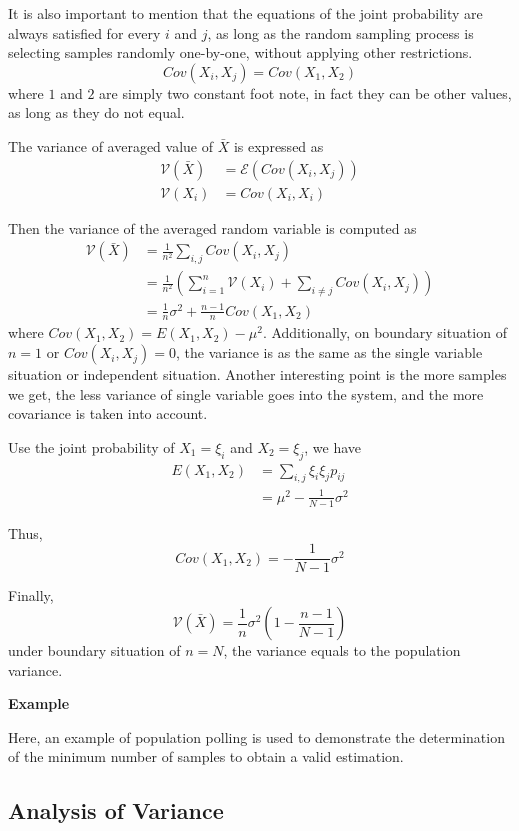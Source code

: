 It is also important to mention that the equations of the joint probability are always satisfied for every $i$ and $j$,
as long as the random sampling process is selecting samples randomly one-by-one, without applying other restrictions.
\begin{equation*}
    Cov(X_i, X_j) = Cov(X_1, X_2)
\end{equation*}
where $1$ and $2$ are simply two constant foot note,
in fact they can be other values,
as long as they do not equal.

The variance of averaged value of $\bar{X}$ is expressed as
\begin{align}
    \label{Equation: The Relationship between Variance and Covariance}
    \mathcal{V}(\bar{X}) & = \mathcal{E}(Cov(X_i, X_j)) \\
    \mathcal{V}(X_i)     & = Cov(X_i, X_i)
\end{align}

Then the variance of the averaged random variable is computed as
\begin{align*}
    \mathcal{V}({\bar{X}}) & = \frac{1}{n^2} \sum_{i, j} Cov(X_i, X_j)                                       \\
                           & = \frac{1}{n^2} (\sum_{i=1}^{n}\mathcal{V}(X_i) + \sum_{i \neq j}Cov(X_i, X_j)) \\
                           & = \frac{1}{n} \sigma^2 + \frac{n-1}{n} Cov(X_1, X_2)
\end{align*}
where $Cov(X_1, X_2) = E(X_1, X_2) - \mu^2$.
Additionally, on boundary situation of $n=1$ or $Cov(X_i, X_j)=0$,
the variance is as the same as the single variable situation or independent situation.
Another interesting point is the more samples we get,
the less variance of single variable goes into the system,
and the more covariance is taken into account.

Use the joint probability of $X_1=\xi_i$ and $X_2=\xi_j$, we have
\begin{align*}
    E(X_1, X_2) & = \sum_{i, j} \xi_i \xi_j p_{ij} \\
                & = \mu^2 - \frac{1}{N-1} \sigma^2
\end{align*}

Thus,
\begin{equation*}
    Cov(X_1, X_2) = - \frac{1}{N-1} \sigma^2
\end{equation*}

Finally,
\begin{equation*}
    \mathcal{V}(\bar{X})  = \frac{1}{n} \sigma^2 (1 - \frac{n-1}{N-1})
\end{equation*}
under boundary situation of $n=N$, the variance equals to the population variance.

\textbf{Example}

Here, an example of population polling is used to demonstrate the determination of the minimum number of samples to obtain a valid estimation.

\subsection{Analysis of Variance}

